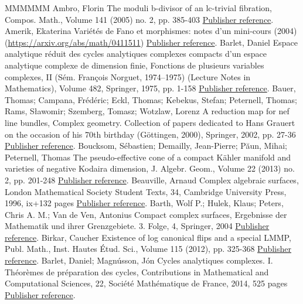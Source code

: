 \begin{thebibliography}{MMMMMM}
 Ambro, Florin The moduli b-divisor of an lc-trivial fibration, Compos. Math., Volume 141 (2005) no. 2, pp. 385-403 \href{https://ahl.centre-mersenne.org/item/AHL_2020__3__473_0/#Amb05a}{Publisher reference}.
 Amerik, Ekaterina Variétés de Fano et morphismes: notes d’un mini-cours (2004) (\url{https://arxiv.org/abs/math/0411511}) \href{https://ahl.centre-mersenne.org/item/AHL_2020__3__473_0/#Ame04}{Publisher reference}.
 Barlet, Daniel Espace analytique réduit des cycles analytiques complexes compacts d’un espace analytique complexe de dimension finie, Fonctions de plusieurs variables complexes, II (Sém. François Norguet, 1974–1975) (Lecture Notes in Mathematics), Volume 482, Springer, 1975, pp. 1-158 \href{https://ahl.centre-mersenne.org/item/AHL_2020__3__473_0/#Bar75}{Publisher reference}.
 Bauer, Thomas; Campana, Frédéric; Eckl, Thomas; Kebekus, Stefan; Peternell, Thomas; Rams, Sławomir; Szemberg, Tomasz; Wotzlaw, Lorenz A reduction map for nef line bundles, Complex geometry. Collection of papers dedicated to Hans Grauert on the occasion of his 70th birthday (Göttingen, 2000), Springer, 2002, pp. 27-36 \href{https://ahl.centre-mersenne.org/item/AHL_2020__3__473_0/#BCE+}{Publisher reference}.
 Boucksom, Sébastien; Demailly, Jean-Pierre; Păun, Mihai; Peternell, Thomas The pseudo-effective cone of a compact Kähler manifold and varieties of negative Kodaira dimension, J. Algebr. Geom., Volume 22 (2013) no. 2, pp. 201-248 \href{https://ahl.centre-mersenne.org/item/AHL_2020__3__473_0/#BDPP}{Publisher reference}.
 Beauville, Arnaud Complex algebraic surfaces, London Mathematical Society Student Texts, 34, Cambridge University Press, 1996, ix+132 pages \href{https://ahl.centre-mersenne.org/item/AHL_2020__3__473_0/#Bea96}{Publisher reference}.
 Barth, Wolf P.; Hulek, Klaus; Peters, Chris A. M.; Van de Ven, Antonius Compact complex surfaces, Ergebnisse der Mathematik und ihrer Grenzgebiete. 3. Folge, 4, Springer, 2004 \href{https://ahl.centre-mersenne.org/item/AHL_2020__3__473_0/#BHPV04}{Publisher reference}.
 Birkar, Caucher Existence of log canonical flips and a special LMMP, Publ. Math., Inst. Hautes Étud. Sci., Volume 115 (2012), pp. 325-368 \href{https://ahl.centre-mersenne.org/item/AHL_2020__3__473_0/#Bir12}{Publisher reference}.
 Barlet, Daniel; Magnússon, Jón Cycles analytiques complexes. I. Théorèmes de préparation des cycles, Contributions in Mathematical and Computational Sciences, 22, Société Mathématique de France, 2014, 525 pages \href{https://ahl.centre-mersenne.org/item/AHL_2020__3__473_0/#BM14}{Publisher reference}.

\end{thebibliography}
